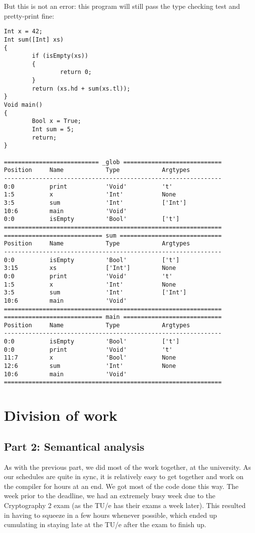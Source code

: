 \documentclass[a4paper]{article}
\begin{document}
But this is not an error: this program will still pass the type checking test and pretty-print fine: 
\begin{verbatim}
Int x = 42;
Int sum([Int] xs)
{
        if (isEmpty(xs))
        {
                return 0;
        }
        return (xs.hd + sum(xs.tl));
}
Void main()
{
        Bool x = True;
        Int sum = 5;
        return;
}

=========================== _glob ============================
Position     Name            Type            Argtypes            
--------------------------------------------------------------
0:0          print           'Void'          't'                 
1:5          x               'Int'           None                
3:5          sum             'Int'           ['Int']             
10:6         main            'Void'                              
0:0          isEmpty         'Bool'          ['t']               
==============================================================
============================ sum =============================
Position     Name            Type            Argtypes            
--------------------------------------------------------------
0:0          isEmpty         'Bool'          ['t']               
3:15         xs              ['Int']         None                
0:0          print           'Void'          't'                 
1:5          x               'Int'           None                
3:5          sum             'Int'           ['Int']             
10:6         main            'Void'                              
==============================================================
============================ main ============================
Position     Name            Type            Argtypes            
--------------------------------------------------------------
0:0          isEmpty         'Bool'          ['t']               
0:0          print           'Void'          't'                 
11:7         x               'Bool'          None                
12:6         sum             'Int'           None                
10:6         main            'Void'                              
==============================================================
\end{verbatim}

\section{Division of work}

\subsection{Part 2: Semantical analysis}
As with the previous part, we did most of the work together, at the university. As our schedules are quite in sync, it is relatively easy to get together and work on the compiler for hours at an end. We got most of the code done this way. The week prior to the deadline, we had an extremely busy week due to the Cryptography 2 exam (as the TU/e has their exams a week later). This resulted in having to squeeze in a few hours whenever possible, which ended up cumulating in staying late at the TU/e after the exam to finish up.
\end{document}
